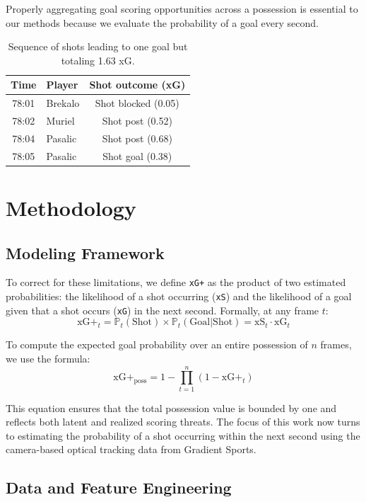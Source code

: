\documentclass[12pt,letterpaper]{article}
\begin{document}
Properly aggregating goal scoring opportunities across a possession is essential to our methods because we evaluate the probability of a goal every second. 


\begin{table}[H]
\centering
\caption{Sequence of shots leading to one goal but totaling 1.63 xG.}
\label{tab:orlando}
\begin{tabular}{|c|l|c|}
\hline
\textbf{Time} & \textbf{Player} & \textbf{Shot outcome (xG)} \\
\hline
78:01 & Brekalo & Shot blocked (0.05) \\
78:02 & Muriel  & Shot post (0.52) \\
78:04 & Pasalic & Shot post (0.68) \\
78:05 & Pasalic & Shot goal (0.38) \\
\hline
\end{tabular}
\end{table}


\section{Methodology}

\subsection{Modeling Framework}

To correct for these limitations, we define \texttt{xG+} as the product of two estimated probabilities: the likelihood of a shot occurring (\texttt{xS}) and the likelihood of a goal given that a shot occurs (\texttt{xG}) in the next second. Formally, at any frame $t$:
\[
\text{xG+}_t = \mathbb{P}_t(\text{Shot}) \times \mathbb{P}_t(\text{Goal} | \text{Shot}) = \text{xS}_t \cdot \text{xG}_t
\]

To compute the expected goal probability over an entire possession of $n$ frames, we use the formula:
\[
\text{xG+}_{\text{poss}} = 1 - \prod_{t=1}^{n} \left(1 - \text{xG+}_t\right)
\]

This equation ensures that the total possession value is bounded by one and reflects both latent and realized scoring threats. The focus of this work now turns to estimating the probability of a shot occurring within the next second using the camera-based optical tracking data from Gradient Sports.

\subsection{Data and Feature Engineering}
\end{document}

